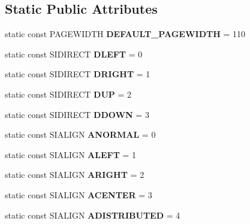 \subsection*{Static Public Attributes}
\begin{DoxyCompactItemize}
\item 
\mbox{\label{class_s_i_t_e_x_t_ad4c4ba4c15b734d5038ae82f038779f1}} 
static const P\+A\+G\+E\+W\+I\+D\+TH {\bfseries D\+E\+F\+A\+U\+L\+T\+\_\+\+P\+A\+G\+E\+W\+I\+D\+TH} = 110
\item 
\mbox{\label{class_s_i_t_e_x_t_acd47e2cd990b809fd5b3df970f25eda3}} 
static const S\+I\+D\+I\+R\+E\+CT {\bfseries D\+L\+E\+FT} = 0
\item 
\mbox{\label{class_s_i_t_e_x_t_ac683b6b1392ce822739d6babb5c29b85}} 
static const S\+I\+D\+I\+R\+E\+CT {\bfseries D\+R\+I\+G\+HT} = 1
\item 
\mbox{\label{class_s_i_t_e_x_t_a9cdedd80b9b3c3004f358c84cf48eead}} 
static const S\+I\+D\+I\+R\+E\+CT {\bfseries D\+UP} = 2
\item 
\mbox{\label{class_s_i_t_e_x_t_a4f9934231fee1aa7f8dbfe99a3445b00}} 
static const S\+I\+D\+I\+R\+E\+CT {\bfseries D\+D\+O\+WN} = 3
\item 
\mbox{\label{class_s_i_t_e_x_t_a70ee6d49ffd606c7ec5630405e40e9cc}} 
static const S\+I\+A\+L\+I\+GN {\bfseries A\+N\+O\+R\+M\+AL} = 0
\item 
\mbox{\label{class_s_i_t_e_x_t_ae6b33fa9357761a024a62610768c0eba}} 
static const S\+I\+A\+L\+I\+GN {\bfseries A\+L\+E\+FT} = 1
\item 
\mbox{\label{class_s_i_t_e_x_t_a434d89edad0962a98947b25ac6f4ae00}} 
static const S\+I\+A\+L\+I\+GN {\bfseries A\+R\+I\+G\+HT} = 2
\item 
\mbox{\label{class_s_i_t_e_x_t_a9689bfe5dd5cf248de2f6ae14981034e}} 
static const S\+I\+A\+L\+I\+GN {\bfseries A\+C\+E\+N\+T\+ER} = 3
\item 
\mbox{\label{class_s_i_t_e_x_t_a2e657aa73d2793472e6179a05ed4c40c}} 
static const S\+I\+A\+L\+I\+GN {\bfseries A\+D\+I\+S\+T\+R\+I\+B\+U\+T\+ED} = 4
\end{DoxyCompactItemize}
